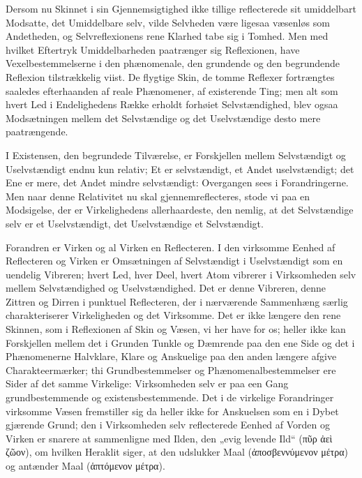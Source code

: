 \documentclass[11pt]{book}
\newcommand{\opage}[1]{\marginnote{\footnotesize\textit{[#1]}}}
\begin{document}
Dersom nu Skinnet i sin Gjennemsigtighed ikke tillige reflecterede
sit umiddelbart Modsatte, det Umiddelbare selv, vilde Selvheden
være ligesaa væsenløs som Andetheden, og Selvreflexionens rene
Klarhed tabe sig i Tomhed. Men med hvilket Eftertryk
Umiddelbarheden paatrænger sig Reflexionen, have
Vexelbestemmelserne i den phænomenale, den grundende og den
begrundende Reflexion tilstrækkelig viist. De flygtige Skin, de
tomme Reflexer fortrængtes saaledes efterhaanden af reale
Phænomener, af existerende Ting; men alt som hvert Led i
Endelighedens Række erholdt forhøiet Selvstændighed, blev ogsaa
Modsætningen mellem det Selvstændige og det Uselvstændige desto
mere paatrængende.

I Existensen, den begrundede Tilværelse, er Forskjellen mellem
Selvstændigt og Uselvstændigt endnu kun relativ; Et er
selvstændigt, et Andet uselvstændigt; det Ene er mere, det Andet
mindre selvstændigt: Overgangen sees i Forandringerne. Men naar
denne Relativitet nu skal gjennemreflecteres, stode
vi paa en Modsigelse, der er Virkelighedens allerhaardeste,
\opage{109} \setcounter{footnote}{0}%
den nemlig, at det Selvstændige selv er et Uselvstændigt, det
Uselvstændige et Selvstændigt.

Forandren er Virken og al Virken en Reflecteren. I den virksomme
Eenhed af Reflecteren og Virken er Omsætningen af Selvstændigt i
Uselvstændigt som en uendelig Vibreren; hvert Led, hver Deel, hvert
Atom vibrerer i Virksomheden selv mellem Selvstændighed og
Uselvstændighed. Det er denne Vibreren, denne Zittren og Dirren i
punktuel Reflecteren, der i nærværende Sammenhæng særlig
charakteriserer Virkeligheden og det Virksomme. Det er ikke
længere den rene Skinnen, som i Reflexionen af Skin og Væsen, vi
her have for os; heller ikke kan Forskjellen mellem det i Grunden
Tunkle og Dæmrende paa den ene Side og det i Phænomenerne
Halvklare, Klare og Anskuelige paa den anden længere afgive
Charakteermærker; thi Grundbestemmelser og Phænomenalbestemmelser
ere Sider af det samme Virkelige: Virksomheden selv er paa een
Gang grundbestemmende og existensbestemmende. Det i de virkelige
Forandringer virksomme Væsen fremstiller sig da heller ikke for
Anskuelsen som en i Dybet gjærende Grund; den i Virksomheden selv
reflecterede Eenhed af Vorden og Virken er snarere at sammenligne
med Ilden, den „evig levende Ild“ (πῦρ ἀεὶ ζῶον), om hvilken
Heraklit siger, at den udslukker Maal (ἀποσβεννύμενον μέτρα) og
antænder Maal (ἁπτόμενον μέτρα).
\end{document}
